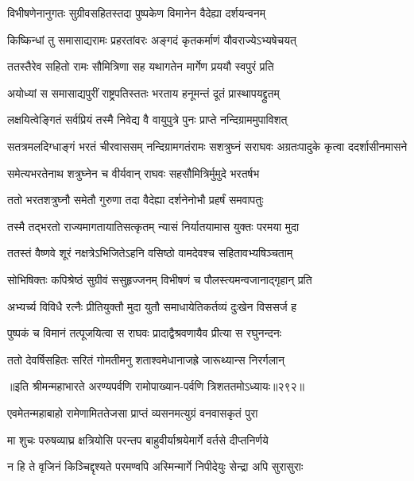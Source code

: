 \twolineshloka
{विभीषणेनानुगतः सुग्रीवसहितस्तदा}
{पुष्पकेण विमानेन वैदेह्या दर्शयन्वनम्}


\twolineshloka
{किष्किन्धां तु समासाद्यरामः प्रहरतांवरः}
{अङ्गदं कृतकर्माणं यौवराज्येऽभ्यषेचयत्}


\twolineshloka
{ततस्तैरेव सहितो रामः सौमित्रिणा सह}
{यथागतेन मार्गेण प्रययौ स्वपुरं प्रति}


\twolineshloka
{अयोध्यां स समासाद्यपुरीं राष्ट्रपतिस्ततः}
{भरताय हनूमन्तं दूतं प्रास्थापयद्द्रुतम्}


\twolineshloka
{लक्षयित्वेङ्गितं सर्वप्रियं तस्मै निवेद्य वै}
{वायुपुत्रे पुनः प्राप्ते नन्दिग्राममुपाविशत्}


\threelineshloka
{सतत्रमलदिग्धाङ्गं भरतं चीरवाससम्}
{नन्दिग्रामगतंरामः सशत्रुघ्नं सराघवः}
{अग्रतःपादुके कृत्वा ददर्शासीनमासने}


\twolineshloka
{समेत्यभरतेनाथ शत्रुघ्नेन च वीर्यवान्}
{राघवः सहसौमित्रिर्मुमुदे भरतर्षभ}


\twolineshloka
{ततो भरतशत्रुघ्नौ समेतौ गुरुणा तदा}
{वैदेह्या दर्शनेनोभौ प्रहर्षं समवापतुः}


\twolineshloka
{तस्मै तद्भरतो राज्यमागतायातिसत्कृतम्}
{न्यासं निर्यातयामास युक्तः परमया मुदा}


\twolineshloka
{ततस्तं वैष्णवे शूरं नक्षत्रेऽभिजितेऽहनि}
{वसिष्ठो वामदेवश्च सहितावभ्यषिञ्चताम्}


\twolineshloka
{सोभिषिक्तः कपिश्रेष्ठं सुग्रीवं ससुहृज्जनम्}
{विभीषणं च पौलस्त्यमन्वजानाद्गृहान् प्रति}


\twolineshloka
{अभ्यर्च्य विविधै रत्नैः प्रीतियुक्तौ मुदा युतौ}
{समाधायेतिकर्तव्यं दुःखेन विससर्ज ह}


\twolineshloka
{पुष्पकं च विमानं तत्पूजयित्वा स राघवः}
{प्रादाद्वैश्रवणायैव प्रीत्या स रघुनन्दनः}


\twolineshloka
{ततो देवर्षिसहितः सरितं गोमतीमनु}
{शताश्वमेधानाजह्रे जारूथ्यान्स निरर्गलान्}


॥इति श्रीमन्महाभारते अरण्यपर्वणि रामोपाख्यान-पर्वणि त्रिशततमोऽध्यायः॥२९२॥

\storymeta

\resetShloka



\twolineshloka
{एवमेतन्महाबाहो रामेणामिततेजसा}
{प्राप्तं व्यसनमत्युग्रं वनवासकृतं पुरा}


\twolineshloka
{मा शुचः परुषव्याघ्र क्षत्रियोसि परन्तप}
{बाहुवीर्याश्रयेमार्गे वर्तसे दीप्तनिर्णये}


\twolineshloka
{न हि ते वृजिनं किञ्चिद्दृश्यते परमण्वपि}
{अस्मिन्मार्गे निपीदेयुः सेन्द्रा अपि सुरासुराः}


